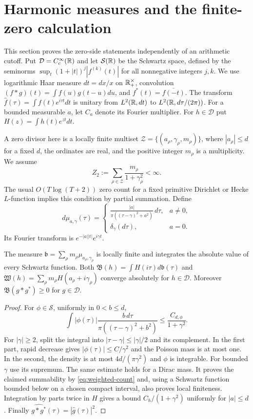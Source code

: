 \section{Harmonic measures and the finite-zero calculation}
\label{sec:harmonic}
This section proves the zero-side statements independently of an
arithmetic cutoff. Put $\mathcal D= C_c^\infty(\mathbb R)$ and let
$\mathcal S(\mathbb R)$ be the Schwartz space, defined by the seminorms
$\sup_t(1+|t|)^j|f^{(k)}(t)|$ for all nonnegative integers $j,k$.
We use logarithmic Haar measure $dt=dx/x$ on $\mathbb R_+^\times$,
convolution $(f*g)(t)=\int f(u)g(t-u)du$, and
$f^*(t)=\overline{f(-t)}$. The transform
$\widehat f(\tau)=\int f(t)e^{i\tau t}dt$ is unitary from
$L^2(\mathbb R,dt)$ to $L^2(\mathbb R,d\tau/(2\pi))$.
For a bounded measurable $a$, let $C_a$ denote its Fourier multiplier.
For $h\in\mathcal D$ put $H(z)=\int h(t)e^{zt}dt$.

A zero divisor here is a locally finite multiset
$\mathcal Z=\{(a_\rho,\gamma_\rho,m_\rho)\}$, where
$|a_\rho|\leq d$ for a fixed $d$, the ordinates are real, and the
positive integer $m_\rho$ is a multiplicity. We assume
\begin{equation}\label{eq:weighted-count}
 Z_2:=\sum_{\rho\in\mathcal Z}\frac{m_\rho}{1+\gamma_\rho^2}<\infty.
\end{equation}
The usual $O(T\log(T+2))$ zero count for a fixed primitive Dirichlet
or Hecke $L$-function implies this condition by partial summation.
Define
\[
 d\mu_{a,\gamma}(\tau)=
 \begin{cases}
 \displaystyle\frac{|a|}{\pi((\tau-\gamma)^2+a^2)}\,d\tau,&a\ne0,\\
 \delta_\gamma(d\tau),&a=0.
 \end{cases}
\]
Its Fourier transform is $e^{-|a||t|}e^{i\gamma t}$.

\begin{proposition}\label{prop:summability}
The measure $\mathfrak b=\sum_\rho m_\rho\mu_{a_\rho,\gamma_\rho}$
is locally finite and integrates the absolute value of every Schwartz
function. Both $\mathfrak B(h)=\int H(i\tau)d\mathfrak b(\tau)$ and
$\mathfrak W(h)=\sum_\rho m_\rho H(a_\rho+i\gamma_\rho)$ converge
absolutely for $h\in\mathcal D$. Moreover
$\mathfrak B(g*g^*)\geq0$ for $g\in\mathcal D$.
\end{proposition}
\begin{proof}
For $\phi\in\mathcal S$, uniformly in $0<b\leq d$,
\[
 \int |\phi(\tau)|\frac{b\,d\tau}{\pi((\tau-\gamma)^2+b^2)}
 \leq \frac{C_{d,\phi}}{1+\gamma^2}.
\]
For $|\gamma|\geq2$, split the integral into
$|\tau-\gamma|\leq|\gamma|/2$ and its complement. In the first
part, rapid decrease gives $|\phi(\tau)|\leq C/\gamma^2$ and the
Poisson mass is at most one. In the second, the density is at most
$4d/(\pi\gamma^2)$ and $\phi$ is integrable. For bounded $\gamma$
use its supremum. The same estimate holds for a Dirac mass.
It proves the claimed summability by \eqref{eq:weighted-count} and,
using a Schwartz function bounded below on a chosen compact interval,
also proves local finiteness. Integration by parts twice in $H$
gives a bound $C_h/(1+\gamma^2)$ uniformly for $|a|\leq d$.
Finally $\widehat{g*g^*}(\tau)=|\widehat g(\tau)|^2$.
\end{proof}

